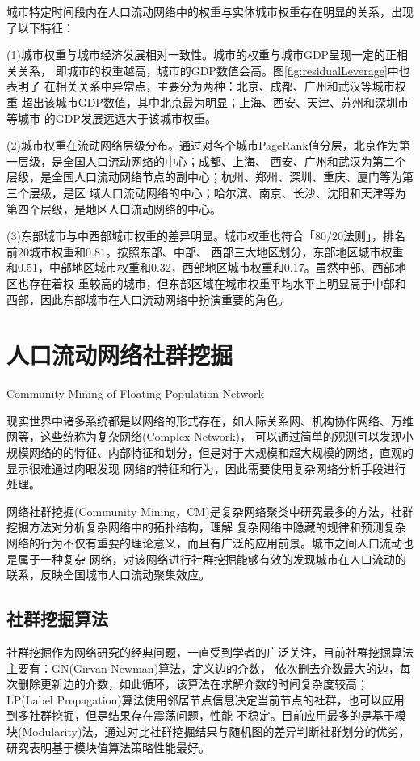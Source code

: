 城市特定时间段内在人口流动网络中的权重与实体城市权重存在明显的关系，出现了以下特征：

(1)城市权重与城市经济发展相对一致性。城市的权重与城市GDP呈现一定的正相关关系，
即城市的权重越高，城市的GDP数值会高。图\ref{fig:residualLeverage}中也表明了
在相关关系中异常点，主要分为两种：北京、成都、广州和武汉等城市权重
超出该城市GDP数值，其中北京最为明显；上海、西安、天津、苏州和深圳市等城市
的GDP发展远远大于该城市权重。

(2)城市权重在流动网络层级分布。通过对各个城市PageRank值分层，北京作为第一层级，是全国人口流动网络的中心；成都、上海、
西安、广州和武汉为第二个层级，是全国人口流动网络节点的副中心；杭州、郑州、深圳、重庆、厦门等为第三个层级，是区
域人口流动网络的中心；哈尔滨、南京、长沙、沈阳和天津等为第四个层级，是地区人口流动网络的中心。

(3)东部城市与中西部城市权重的差异明显。城市权重也符合「$80/20$法则」，排名前$20$城市权重和$0.81$。按照东部、中部、
西部三大地区划分，东部地区城市权重和$0.51$，中部地区城市权重和$0.32$，西部地区城市权重和$0.17$。虽然中部、西部地区也存在着权
重较高的城市，但东部区域在城市权重平均水平上明显高于中部和西部，因此东部城市在人口流动网络中扮演重要的角色。


\section{人口流动网络社群挖掘}{Community Mining of Floating Population Network}

现实世界中诸多系统都是以网络的形式存在，如人际关系网、机构协作网络、万维网等，这些统称为复杂网络(Complex Network)，
可以通过简单的观测可以发现小规模网络的的特征、内部特征和划分，但是对于大规模和超大规模的网络，直观的显示很难通过肉眼发现
网络的特征和行为，因此需要使用复杂网络分析手段进行处理\cite{Girvan2002Community}。

网络社群挖掘(Community Mining，CM)是复杂网络聚类中研究最多的方法，社群挖掘方法对分析复杂网络中的拓扑结构，理解
复杂网络中隐藏的规律和预测复杂网络的行为不仅有重要的理论意义，而且有广泛的应用前景。城市之间人口流动也是属于一种复杂
网络，对该网络进行社群挖掘能够有效的发现城市在人口流动的联系，反映全国城市人口流动聚集效应。

\subsection{社群挖掘算法}

社群挖掘作为网络研究的经典问题，一直受到学者的广泛关注，目前社群挖掘算法主要有：GN(Girvan Newman)算法，定义边的介数，
依次删去介数最大的边，每次删除更新边的介数，如此循环，该算法在求解介数的时间复杂度较高\cite{Girvan2001Community}；
LP(Label Propagation)算法使用邻居节点信息决定当前节点的社群，也可以应用到多社群挖掘，但是结果存在震荡问题，性能
不稳定\cite{Raghavan2007Near}。目前应用最多的是基于模块(Modularity)法，通过对比社群挖掘结果与随机图的差异判断社群划分的优劣，
研究表明基于模块值算法策略性能最好\cite{Newman2006Modularity}。


